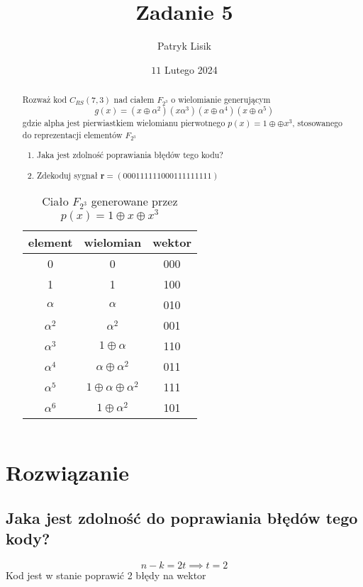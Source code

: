 \documentclass[12pt]{article}
\title{Zadanie 5}
\author{Patryk Lisik}
\date{\(11\) Lutego  2024}
\begin{document}
    \maketitle
    \renewcommand{\abstractname}{Treść}

    \begin{abstract}
        Rozważ kod $C_{RS}(7,3)$ nad ciałem $F_{2^3}$ o wielomianie generującym 
        $$ g(x)=(x \oplus \alpha^2)(x \alpha^3)(x \oplus \alpha^4)(x \oplus \alpha^5) $$
        gdzie alpha jest pierwiastkiem wielomianu pierwotnego $p(x) = 1 \oplus \oplus x^3$, stosowanego do reprezentacji
        elementów $F_{2^3}$ 


    \begin{enumerate}[label=(\alph*)]
        \item Jaka jest zdolność poprawiania błędów tego kodu?
        \item Zdekoduj sygnał $\mathbf{r} = (000 111 111 000 111 111 111)$
    \end{enumerate}

        \begin{table}[h]
            \centering
            \begin{tabular}{ccc}
                element & wielomian & wektor \\ \hline
                0 & 0 & 000 \\ 
                1 & 1 & 100 \\ 
                $\alpha$ & $\alpha$ & 010 \\
                $\alpha^2$ & $\alpha^2$ & 001 \\
                $\alpha^3$ & $1 \oplus \alpha$ & 110 \\
                $\alpha^4$ & $\alpha \oplus \alpha^2$ & 011 \\
                $\alpha^5$ & $1 \oplus \alpha \oplus \alpha^2$ & 111 \\
                $\alpha^6$ & $1 \oplus \alpha^2$ & 101 \\
            \end{tabular}
            \caption{Ciało $F_{2^3}$ generowane przez $p(x) = 1\oplus x \oplus x^3 $  }
        \end{table}

    \end{abstract}



    \section*{Rozwiązanie}
    \subsection*{Jaka jest zdolność do poprawiania błędów tego kody? } 
    $$ n - k = 2t \implies t=2 $$ 
    Kod jest w stanie poprawić 2 błędy na wektor 


    
\end{document}
